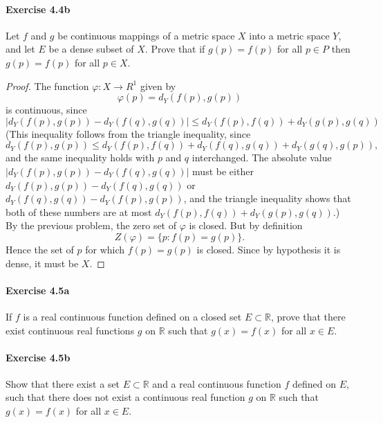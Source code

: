 \documentclass{article}
\theoremstyle{definition}
\begin{document}
\paragraph{Exercise 4.4b} Let $f$ and $g$ be continuous mappings of a metric space $X$ into a metric space $Y$, and let $E$ be a dense subset of $X$. Prove that if $g(p) = f(p)$ for all $p \in P$ then $g(p) = f(p)$ for all $p \in X$.
\begin{proof}
    The function $\varphi: X \rightarrow R^1$ given by
$$
\varphi(p)=d_Y(f(p), g(p))
$$
is continuous, since
$$
\left|d_Y(f(p), g(p))-d_Y(f(q), g(q))\right| \leq d_Y(f(p), f(q))+d_Y(g(p), g(q))
$$
(This inequality follows from the triangle inequality, since
$$
d_Y(f(p), g(p)) \leq d_Y(f(p), f(q))+d_Y(f(q), g(q))+d_Y(g(q), g(p)),
$$
and the same inequality holds with $p$ and $q$ interchanged. The absolute value $\left|d_Y(f(p), g(p))-d_Y(f(q), g(q))\right|$ must be either $d_Y(f(p), g(p))-d_Y(f(q), g(q))$ or $d_Y(f(q), g(q))-d_Y(f(p), g(p))$, and the triangle inequality shows that both of these numbers are at most $d_Y(f(p), f(q))+d_Y(g(p), g(q))$.)
By the previous problem, the zero set of $\varphi$ is closed. But by definition
$$
Z(\varphi)=\{p: f(p)=g(p)\} .
$$
Hence the set of $p$ for which $f(p)=g(p)$ is closed. Since by hypothesis it is dense, it must be $X$.
\end{proof}



\paragraph{Exercise 4.5a} If $f$ is a real continuous function defined on a closed set $E \subset \mathbb{R}$, prove that there exist continuous real functions $g$ on $\mathbb{R}$ such that $g(x)=f(x)$ for all $x \in E$.


\paragraph{Exercise 4.5b} Show that there exist a set $E \subset \mathbb{R}$ and a real continuous function $f$ defined on $E$, such that there does not exist a continuous real function $g$ on $\mathbb{R}$ such that $g(x)=f(x)$ for all $x \in E$.
\end{document}
